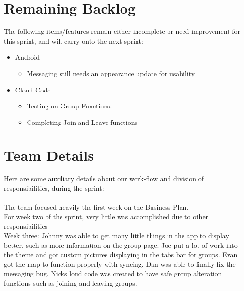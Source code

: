 \documentclass[11pt]{article}
\begin{document}
\section*{Remaining Backlog}
The following items/features remain either incomplete or need improvement for this sprint, and will carry onto the next sprint:
	\begin{itemize}
		\item Android
		\begin{itemize}
			\item Messaging still needs an appearance update for usability
		\end{itemize}
		\item Cloud Code
		\begin{itemize}
			\item Testing on Group Functions.
			\item Completing Join and Leave functions
		\end{itemize}
	\end{itemize}


	
\section*{Team Details}
Here are some auxiliary details about our work-flow and division of responsibilities, during the sprint: \\\\

The team focused heavily the first week on the Business Plan.\\

For week two of the sprint, very little was accomplished due to other responsibilities\\

Week three: Johnny was able to get many little things in the app to display better, such as more information on the group page. Joe put a lot of work into the theme and got custom pictures displaying in the tabs bar for groups. Evan got the map to function properly with syncing. Dan was able to finally fix the messaging bug. Nicks loud code was created to have safe group alteration functions such as joining and leaving groups.\\
\end{document}
